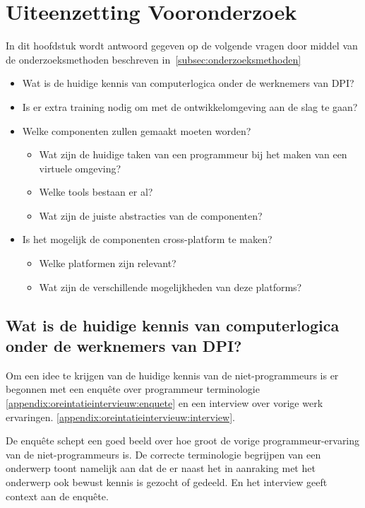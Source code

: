 \chapter{Uiteenzetting Vooronderzoek}
\label{ch:onderzoek}

In dit hoofdstuk wordt antwoord gegeven op de volgende vragen door middel van de onderzoeksmethoden beschreven in~\ref{subsec:onderzoeksmethoden}

\begin{itemize}
\item Wat is de huidige kennis van computerlogica onder de werknemers van DPI?
\item Is er extra training nodig om met de ontwikkelomgeving aan de slag te gaan?
\item Welke componenten zullen gemaakt moeten worden?
	\begin{itemize}
	\item Wat zijn de huidige taken van een programmeur bij het maken van een virtuele omgeving?
	\item Welke tools bestaan er al?
	\item Wat zijn de juiste abstracties van de componenten? 
	\end{itemize}
\item Is het mogelijk de componenten cross-platform te maken?
	\begin{itemize}
	\item Welke platformen zijn relevant?
	\item Wat zijn de verschillende mogelijkheden van deze platforms?
	\end{itemize}
\end{itemize}

\section{Wat is de huidige kennis van computerlogica onder de werknemers van DPI?}
Om een idee te krijgen van de huidige kennis van de niet-programmeurs is er begonnen met een enquête over programmeur terminologie \ref{appendix:oreintatieintervieuw:enquete} en een interview over vorige werk ervaringen. \ref{appendix:oreintatieintervieuw:interview}. 

De enquête schept een goed beeld over hoe groot de vorige programmeur-ervaring van de niet-programmeurs is. De correcte terminologie begrijpen van een onderwerp toont namelijk aan dat de er naast het in aanraking met het onderwerp ook bewust kennis is gezocht of gedeeld. En het interview geeft context aan de enquête.

